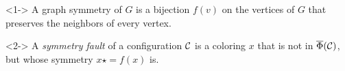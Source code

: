 \begin{frame}
    \begin{definition}<1->
        A graph symmetry of $G$ is a bijection $f(v)$ on the vertices of $G$ that preserves the neighbors of every vertex.
    \end{definition}
    
    \begin{definition}<2->
        A \emph{symmetry fault} of a configuration $\mathcal{C}$ is a coloring $x$ that is not in $\overline{\Phi}(\mathcal{C})$, but whose symmetry $x\star = f(x)$ is.
    \end{definition}

\end{frame}